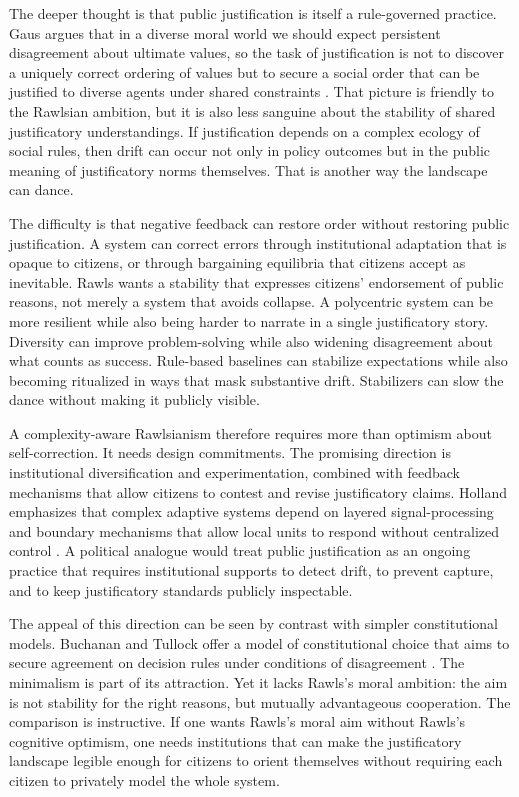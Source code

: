 \documentclass[12pt]{article}
\begin{document}
The deeper thought is that public justification is itself a rule-governed practice. Gaus argues that in a diverse moral world we should expect persistent disagreement about ultimate values, so the task of justification is not to discover a uniquely correct ordering of values but to secure a social order that can be justified to diverse agents under shared constraints \parencite[pp.~42, 283]{gaus2011order}. That picture is friendly to the Rawlsian ambition, but it is also less sanguine about the stability of shared justificatory understandings. If justification depends on a complex ecology of social rules, then drift can occur not only in policy outcomes but in the public meaning of justificatory norms themselves. That is another way the landscape can dance.


The difficulty is that negative feedback can restore order without restoring public justification. A system can correct errors through institutional adaptation that is opaque to citizens, or through bargaining equilibria that citizens accept as inevitable. Rawls wants a stability that expresses citizens' endorsement of public reasons, not merely a system that avoids collapse. A polycentric system can be more resilient while also being harder to narrate in a single justificatory story. Diversity can improve problem-solving while also widening disagreement about what counts as success. Rule-based baselines can stabilize expectations while also becoming ritualized in ways that mask substantive drift. Stabilizers can slow the dance without making it publicly visible.

A complexity-aware Rawlsianism therefore requires more than optimism about self-correction. It needs design commitments. The promising direction is institutional diversification and experimentation, combined with feedback mechanisms that allow citizens to contest and revise justificatory claims. Holland emphasizes that complex adaptive systems depend on layered signal-processing and boundary mechanisms that allow local units to respond without centralized control \parencite[pp.~1--2]{holland2012signals}. A political analogue would treat public justification as an ongoing practice that requires institutional supports to detect drift, to prevent capture, and to keep justificatory standards publicly inspectable.

The appeal of this direction can be seen by contrast with simpler constitutional models. Buchanan and Tullock offer a model of constitutional choice that aims to secure agreement on decision rules under conditions of disagreement \parencite[pp.~6--7]{buchanan1962calculus}. The minimalism is part of its attraction. Yet it lacks Rawls's moral ambition: the aim is not stability for the right reasons, but mutually advantageous cooperation. The comparison is instructive. If one wants Rawls's moral aim without Rawls's cognitive optimism, one needs institutions that can make the justificatory landscape legible enough for citizens to orient themselves without requiring each citizen to privately model the whole system.
\end{document}
